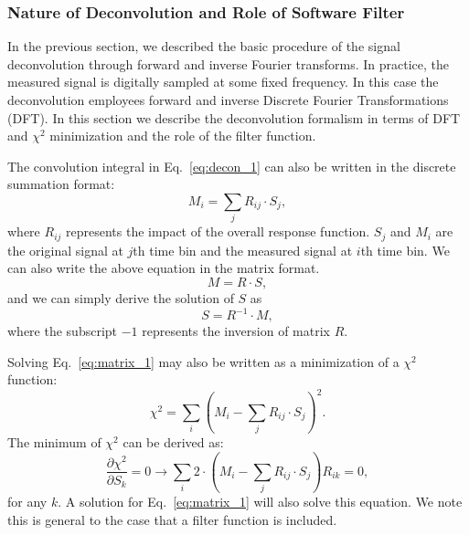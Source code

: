 \subsubsection{Nature of Deconvolution and Role of Software Filter}\label{sec:decon_equiv}

In the previous section, we described the basic procedure of the
signal deconvolution through forward and inverse Fourier transforms. 
%
In practice, the measured signal is digitally sampled at some fixed
frequency.  In this case the deconvolution employees forward and
inverse Discrete Fourier Transformations (DFT).  In this section we
describe the deconvolution formalism in terms of DFT and $\chi^2$
minimization and the role of the filter function.

The convolution integral in Eq.~\ref{eq:decon_1} can also be written 
in the discrete summation format:
\begin{equation}\label{eq:matrix_1}
M_i = \sum_j R_{ij} \cdot S_j,
\end{equation}
where $R_{ij}$ represents the impact of the overall response function. 
$S_j$ and $M_i$ are the original signal at $j$th time bin and 
the measured signal at $i$th time bin. We can also write the above 
equation in the matrix format.
\begin{equation}\label{eq:matrix_2}
M = R \cdot S,
\end{equation}
and we can simply derive the solution of $S$ as 
\begin{equation}\label{eq:matrix_sol}
S = R^{-1} \cdot M,
\end{equation}
where the subscript $-1$ represents the inversion of matrix $R$.


Solving Eq.~\ref{eq:matrix_1} may also be written as a minimization of a $\chi^2$ function:
\begin{equation}
\chi^2 = \sum_i \left( M_i - \sum_j R_{ij} \cdot S_j \right)^2.
\end{equation}
The minimum of $\chi^2$ can be derived as:
\begin{equation}
\frac{\partial \chi^2}{\partial S_k} = 0 \rightarrow 
\sum_i 2 \cdot \left( M_i - \sum_j R_{ij}\cdot S_j \right) R_{ik} = 0,
\end{equation}
for any $k$. 
A solution for
Eq.~\ref{eq:matrix_1} will also solve this equation.
We note this is general to the case that a filter function is included.

